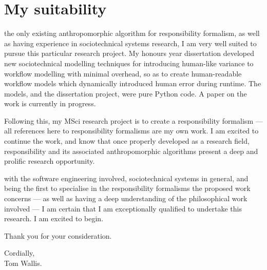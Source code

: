 \section{My suitability}
 the only existing anthropomorphic algorithm for responsibility formalism, as well as having experience in sociotechnical systems research, I am very well suited to pursue this particular research project. My honours year dissertation developed new sociotechnical modelling techniques for introducing human-like variance to workflow modelling with minimal overhead, so as to create human-readable workflow models which dynamically introduced human error during runtime. The models, and the dissertation project, were pure Python code. A paper on the work is currently in progress.\cite{wallis_2016_b}\par

Following this, my MSci research project is to create a responsibility formalism --- all references here to responsibility formalisms are my own work. I am excited to continue the work, and know that once properly developed as a research field, responsibility and its associated anthropomorphic algorithms present a deep and prolific research opportunity.\par

 with the software engineering involved, sociotechnical systems in general, and being the first to specialise in the responsibility formalisms the proposed work concerns --- as well as having a deep understanding of the philosophical work involved\cite{wallis_2016} --- I am certain that I am exceptionally qualified to undertake this research. I am excited to begin.\par\bigskip

Thank you for your consideration.\par

\bigskip
\begin{flushright}
    Cordially,\\
    Tom Wallis.
\end{flushright}





